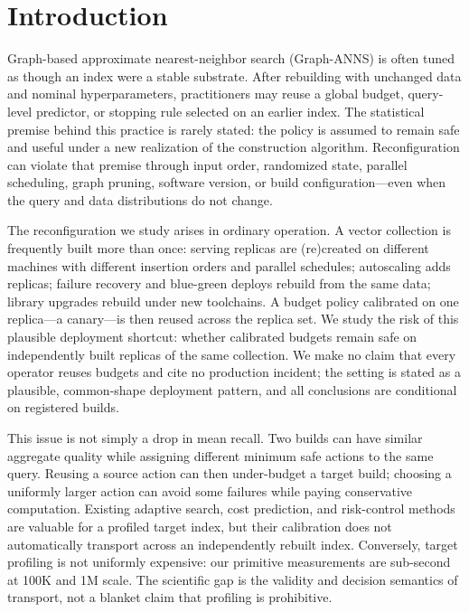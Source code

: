 \documentclass{article}
\begin{document}
\section{Introduction}
\label{sec:intro}

Graph-based approximate nearest-neighbor search (Graph-ANNS) is often tuned as though an index were a
stable substrate. After rebuilding with unchanged data and nominal hyperparameters, practitioners may reuse
a global budget, query-level predictor, or stopping rule selected on an earlier index. The statistical
premise behind this practice is rarely stated: the policy is assumed to remain safe and useful under a new
realization of the construction algorithm. Reconfiguration can violate that premise through input order,
randomized state, parallel scheduling, graph pruning, software version, or build configuration---even when
the query and data distributions do not change.

The reconfiguration we study arises in ordinary operation. A vector collection is frequently built more
than once: serving replicas are (re)created on different machines with different insertion orders and
parallel schedules; autoscaling adds replicas; failure recovery and blue-green deploys rebuild from the same
data; library upgrades rebuild under new toolchains. A budget policy calibrated on one replica---a
canary---is then reused across the replica set. We study the risk of this plausible deployment shortcut:
whether calibrated budgets remain safe on independently built replicas of the same collection. We make no
claim that every operator reuses budgets and cite no production incident; the setting is stated as a
plausible, common-shape deployment pattern, and all conclusions are conditional on registered builds.

This issue is not simply a drop in mean recall. Two builds can have similar aggregate quality while
assigning different minimum safe actions to the same query. Reusing a source action can then under-budget a
target build; choosing a uniformly larger action can avoid some failures while paying conservative
computation. Existing adaptive search, cost prediction, and risk-control methods are valuable for a
profiled target index, but their calibration does not automatically transport across an independently
rebuilt index. Conversely, target profiling is not uniformly expensive: our primitive measurements are
sub-second at 100K and 1M scale. The scientific gap is the validity and decision semantics of transport, not
a blanket claim that profiling is prohibitive.
\end{document}
